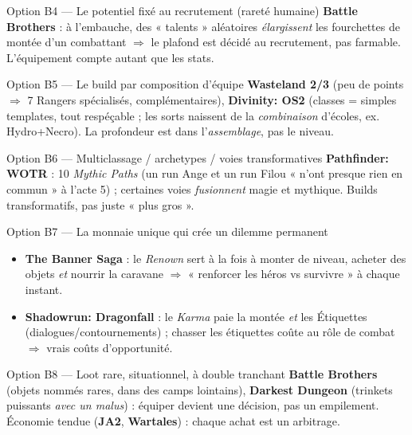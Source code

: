 \documentclass[11pt,a4paper]{article}
\newcommand{\jeu}[1]{\textbf{#1}}
\begin{document}
\begin{optionbox}{Option B4 --- Le potentiel fixé au recrutement (rareté humaine)}
\jeu{Battle Brothers} : à l'embauche, des « talents » aléatoires \emph{élargissent} les fourchettes de montée d'un combattant $\Rightarrow$ le plafond est décidé au recrutement, pas farmable. L'équipement compte autant que les stats.
\end{optionbox}

\begin{optionbox}{Option B5 --- Le build par composition d'équipe}
\jeu{Wasteland 2/3} (peu de points $\Rightarrow$ 7 Rangers spécialisés, complémentaires), \jeu{Divinity: OS2} (classes = simples templates, tout respéçable ; les sorts naissent de la \emph{combinaison} d'écoles, ex. Hydro+Necro). La profondeur est dans l'\emph{assemblage}, pas le niveau.
\end{optionbox}

\begin{optionbox}{Option B6 --- Multiclassage / archetypes / voies transformatives}
\jeu{Pathfinder: WOTR} : 10 \emph{Mythic Paths} (un run Ange et un run Filou « n'ont presque rien en commun » à l'acte 5) ; certaines voies \emph{fusionnent} magie et mythique. Builds transformatifs, pas juste « plus gros ».
\end{optionbox}

\begin{optionbox}{Option B7 --- La monnaie unique qui crée un dilemme permanent}
\begin{itemize}
\item \jeu{The Banner Saga} : le \emph{Renown} sert à la fois à monter de niveau, acheter des objets \emph{et} nourrir la caravane $\Rightarrow$ « renforcer les héros vs survivre » à chaque instant.
\item \jeu{Shadowrun: Dragonfall} : le \emph{Karma} paie la montée \emph{et} les Étiquettes (dialogues/contournements) ; chasser les étiquettes coûte au rôle de combat $\Rightarrow$ vrais coûts d'opportunité.
\end{itemize}
\end{optionbox}

\begin{optionbox}{Option B8 --- Loot rare, situationnel, à double tranchant}
\jeu{Battle Brothers} (objets nommés rares, dans des camps lointains), \jeu{Darkest Dungeon} (trinkets puissants \emph{avec un malus}) : équiper devient une décision, pas un empilement. Économie tendue (\jeu{JA2}, \jeu{Wartales}) : chaque achat est un arbitrage.
\end{optionbox}
\end{document}
